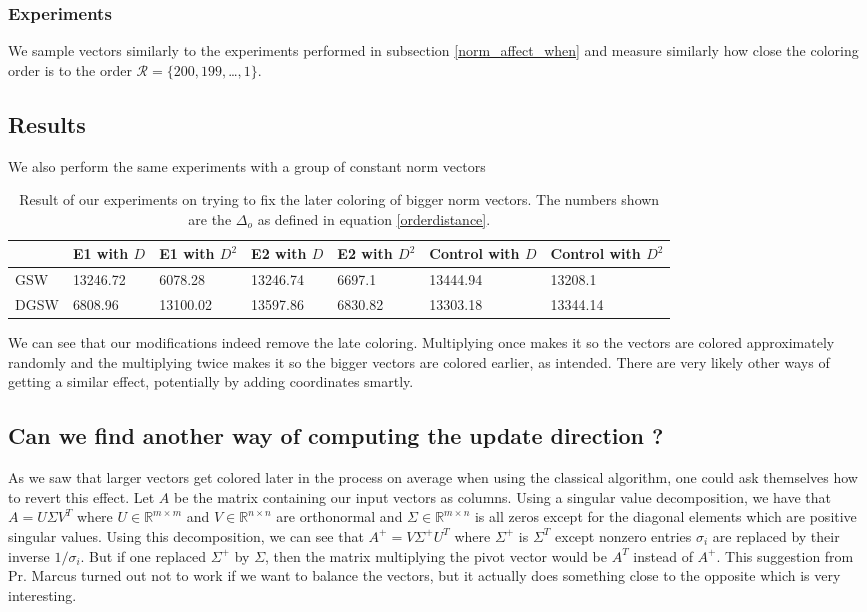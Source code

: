 \documentclass[12pt]{article}
\begin{document}
\subsubsection{Experiments}
We sample vectors similarly to the experiments performed in subsection \ref{norm_affect_when} and measure similarly how close the coloring order is to the order $\mathcal{R}=\{200,199,$\dots$,1\}$.
\subsection{Results}
We also perform the same experiments with a group of constant norm vectors
\begin{center}
\begin{table}[h]
\begin{tabular}{l|llllll}
 &E1 with $D$&E1 with $D^2$& E2 with $D$&E2 with $D^2$& Control with $D$&Control with $D^2$   \\
\hline
GSW&13246.72&6078.28&13246.74&6697.1&13444.94&13208.1\\
DGSW&6808.96&13100.02&13597.86&6830.82&13303.18&13344.14
\end{tabular}
\caption{Result of our experiments on trying to fix the later coloring of bigger norm vectors. The numbers shown are the $\Delta_o$ as defined in equation \ref{orderdistance}.}
\label{norm_earlier}
\end{table}
\end{center}
We can see that our modifications indeed remove the late coloring. Multiplying once makes it so the vectors are colored approximately randomly and the multiplying twice makes it so the bigger vectors are colored earlier, as intended. There are very likely other ways of getting a similar effect, potentially by adding coordinates smartly.

\subsection{Can we find another way of computing the update direction ?}
 As we saw that larger vectors get colored later in the process on average when using the classical algorithm, one could ask themselves how to revert this effect. Let $A$ be the matrix containing our input vectors as columns. Using a singular value decomposition, we have that $A=U\Sigma V^T$ where $U\in\mathbb{R}^{m\times m}$ and $V\in\mathbb{R}^{n\times n}$ are orthonormal and $\Sigma\in\mathbb{R}^{m\times n}$ is all zeros except for the diagonal elements which are positive singular values. Using this decomposition, we can see that $A^+=V\Sigma^+U^T$ where $\Sigma^+$ is $\Sigma^T$ except nonzero entries $\sigma_i$ are replaced by their inverse $1/\sigma_i$. But if one replaced $\Sigma^+$ by $\Sigma$, then the  matrix multiplying the pivot vector would be $A^T$ instead of $A^+$. This suggestion from Pr. Marcus turned out not to work if we want to balance the vectors, but it actually does something close to the opposite which is very interesting. 
\end{document}
